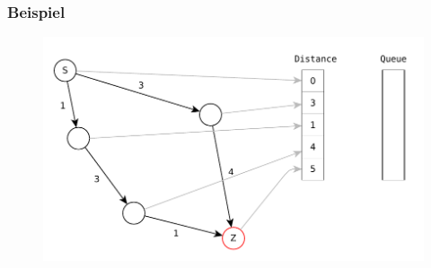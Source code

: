 \begin{frame}
\frametitle{Beispiel}
\begin{figure}
\includegraphics[scale=.8]{dijkstra_graphs/dijkstra_B.pdf}
\end{figure}
\end{frame}